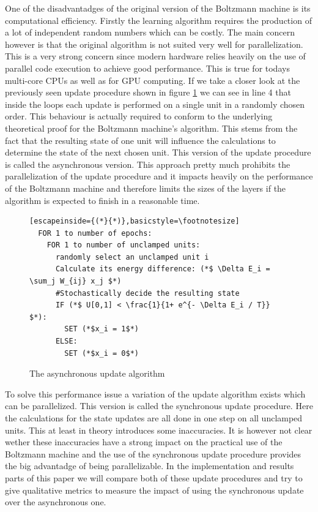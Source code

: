 \documentclass[12pt,twoside]{article}
\theoremstyle{plain}
\theoremstyle{definition}
\theoremstyle{remark}
\begin{document}
One of the disadvantadges of the original version of the Boltzmann machine is its computational efficiency.
Firstly the learning algorithm requires the production of a lot of independent random numbers which can be costly.
The main concern however is that the original algorithm is not suited very well for parallelization.
This is a very strong concern since modern hardware relies heavily on the use of parallel code execution to
achieve good performance. This is true for todays multi-core CPUs as well as for GPU computing.
If we take a closer look at the previously seen update procedure shown in figure \cref{fig:update-alg}
we can see in line 4 that inside the loops each update is performed on a single unit in a randomly chosen
order. This behaviour is actually required to conform to the underlying theoretical proof for the Boltzmann machine's
algorithm. This stems from the fact that the resulting state of one unit will influence the calculations to
determine the state of the next chosen unit. This version of the update procedure is called the asynchronous version.
This approach pretty much prohibits the parallelization of the update procedure and it impacts heavily on the performance
of the Boltzmann machine and therefore limits the sizes of the layers if the algorithm is expected to finish in a reasonable time.

\begin{figure}[h]
\begin{lstlisting}[escapeinside={(*}{*)},basicstyle=\footnotesize]
  FOR 1 to number of epochs:
    FOR 1 to number of unclamped units:
      randomly select an unclamped unit i
      Calculate its energy difference: (*$ \Delta E_i = \sum_j W_{ij} x_j $*)
      #Stochastically decide the resulting state
      IF (*$ U[0,1] < \frac{1}{1+ e^{- \Delta E_i / T}} $*):
        SET (*$x_i = 1$*)
      ELSE:
        SET (*$x_i = 0$*)
\end{lstlisting}
\caption{The asynchronous update algorithm}
\label{fig:update-alg}
\end{figure}

To solve this performance issue a variation of the update algorithm exists which can be parallelized.
This version is called the synchronous update procedure. Here the calculations for the state updates are
all done in one step on all unclamped units. This at least in theory introduces some inaccuracies.
It is however not clear wether these inaccuracies have a strong impact on the practical use of the
Boltzmann machine and the use of the synchronous update procedure provides the big advantadge of
being parallelizable. In the implementation and results parts of this paper we will
compare both of these update procedures and try to give qualitative metrics to measure
the impact of using the synchronous update over the asynchronous one.
\end{document}
